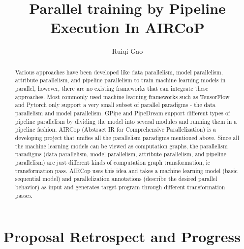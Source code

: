 \documentclass[sigplan]{acmart}\settopmatter{printfolios=true,printccs=false,printacmref=false}
\begin{document}
\sloppy

\title{Parallel training by Pipeline Execution In AIRCoP}

\author{Ruiqi Gao}

\begin{abstract}
  Various approaches have been developed like data parallelism, model parallelism, attribute parallelism, and pipeline parallelism to train machine learning models in parallel, however, there are no existing frameworks that can integrate these approaches. Most commonly used machine learning frameworks such as TensorFlow and Pytorch only support a very small subset of parallel paradigms - the data parallelism and model parallelism. GPipe and PipeDream support different types of pipeline parallelism by dividing the model into several modules and running them in a pipeline fashion.
  AIRCop (Abstract IR for Comprehensive Parallelization) is a developing project that unifies all the parallelism paradigms mentioned above. Since all the machine learning models can be viewed as computation graphs, the parallelism paradigms (data parallelism, model parallelism, attribute parallelism, and pipeline parallelism) are just different kinds of computation graph transformation, ie transformation pass. AIRCop uses this idea and takes a machine learning model (basic sequential model) and parallelization annotations (describe the desired parallel behavior) as input and generates target program through different transformation passes.

\end{abstract}


\maketitle
\section{Proposal Retrospect and Progress}
\end{document}
